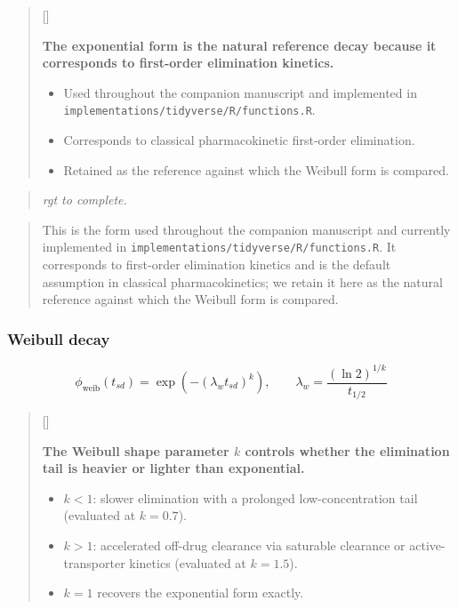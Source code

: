 \documentclass[
  11pt,
]{article}
\newcounter{pgraph}
\newenvironment{bullets}{%
  \stepcounter{pgraph}%
  \begin{quote}\small\sffamily\color[gray]{0.30}%
  {\normalfont\scriptsize\color[gray]{0.58}[\thepgraph]\enspace}}{%
  \end{quote}}
\newenvironment{rgt}{%
  \begin{quote}\small\itshape\color[RGB]{20,60,160}}{%
  \end{quote}}
\newenvironment{orig}{%
  \begin{quote}\normalsize\color[gray]{0.55}}{%
  \end{quote}}
\begin{document}
\begin{bullets}

\textbf{The exponential form is the natural reference decay because
it corresponds to first-order elimination kinetics.}

\begin{itemize}\setlength{\itemsep}{2pt}\setlength{\parskip}{0pt}
\item Used throughout the companion manuscript and implemented in
\texttt{implementations/tidyverse/R/functions.R}.
\item Corresponds to classical pharmacokinetic first-order
elimination.
\item Retained as the reference against which the Weibull form is
compared.
\end{itemize}

\end{bullets}

\begin{rgt}
rgt to complete.

\end{rgt}

\begin{orig}
This is the form used throughout the companion manuscript and
currently implemented in \texttt{implementations/tidyverse/R/functions.R}.
It corresponds to first-order elimination kinetics and is the
default assumption in classical pharmacokinetics; we retain it here
as the natural reference against which the Weibull form is compared.

\end{orig}

\subsubsection{Weibull decay}\label{weibull-decay}

\[
\phi_{\text{weib}}(t_{sd}) =
  \exp\left(-\left(\lambda_w t_{sd}\right)^{k}\right), \qquad
  \lambda_w = \frac{(\ln 2)^{1/k}}{t_{1/2}}
\]

\begin{bullets}

\textbf{The Weibull shape parameter $k$ controls whether the
elimination tail is heavier or lighter than exponential.}

\begin{itemize}\setlength{\itemsep}{2pt}\setlength{\parskip}{0pt}
\item $k < 1$: slower elimination with a prolonged low-concentration
tail (evaluated at $k = 0.7$).
\item $k > 1$: accelerated off-drug clearance via saturable clearance
or active-transporter kinetics (evaluated at $k = 1.5$).
\item $k = 1$ recovers the exponential form exactly.
\end{itemize}

\end{bullets}
\end{document}

